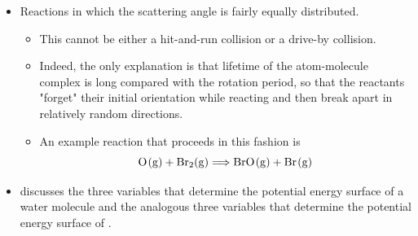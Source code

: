 \documentclass[../notes.tex]{subfiles}
\begin{document}
\begin{itemize}
\begin{itemize}
\begin{itemize}
            \item Based on the measured radii of  and  as \SI{205}{\pico\meter} and \SI{250}{\pico\meter}, respectively, we have that $\sigma_{\ce{K}\ \ce{I2}}=\SI{6.5e5}{\pico\meter\squared}$.
            \item Indeed, this means that if the reactants travel at the maximum impact parameter (see Figure \ref{fig:lineOfCenters}), they would miss each other entirely but somehow still react.
        \end{itemize}
        \item An electron transfer occurs between the two reactants before they collide.
        \begin{itemize}
            \item If two molecules are to react without touching, they must somehow be attracted to each other in manner strong enough to at least temporarily overcome the bond-dissociation energy (BDE) of the molecule.
            \item Research shows that van der Waals interactions would not be strong enough for this, but a Coulomb potential would be.
            \item Additionally, we can directly experimentally verify that this pre-reaction electron transfer occurs.
        \end{itemize}
    \end{itemize}
    \item Reactions in which the scattering angle is fairly equally distributed.
    \begin{itemize}
        \item This cannot be either a hit-and-run collision or a drive-by collision.
        \item Indeed, the only explanation is that lifetime of the atom-molecule complex is long compared with the rotation period, so that the reactants "forget" their initial orientation while reacting and then break apart in relatively random directions.
        \item An example reaction that proceeds in this fashion is
        \begin{equation*}
            \ce{O(g) + Br2(g)} \Longrightarrow \ce{BrO(g) + Br(g)}
        \end{equation*}
    \end{itemize}
    \item \textcite{bib:McQuarrieSimon} discusses the three variables that determine the potential energy surface of a water molecule and the analogous three variables that determine the potential energy surface of .

\end{itemize}
\end{document}
